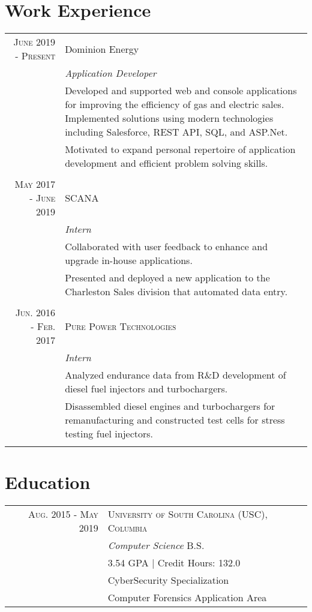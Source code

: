 \documentclass[a4paper,10pt]{article}
\begin{document}
\section{Work Experience}
\begin{tabular}{r|p{11cm}}
 \textsc{June 2019 - Present} & Dominion Energy
 \\&\emph{Application Developer}\\
 &\footnotesize{Developed and supported web and console applications for improving the efficiency of gas and electric sales.  
Implemented solutions using modern technologies including Salesforce, REST API, SQL, and ASP.Net.} \\ & \footnotesize{Motivated to expand personal repertoire of application development and efficient problem solving skills.
 }\\\multicolumn{2}{c}{} \\

 \textsc{May 2017 - June 2019} & SCANA
 \\&\emph{Intern}\\
 &\footnotesize{Collaborated with user feedback to enhance and upgrade in-house applications.} \\& \footnotesize{Presented and deployed a new application to the Charleston Sales division that automated data entry.
 }\\\multicolumn{2}{c}{} \\
 

 \textsc{Jun. 2016 - Feb. 2017} & \textsc{Pure Power Technologies} 
 \\&\emph{Intern}\\&\footnotesize{Analyzed endurance data from R\&D development of diesel fuel injectors and turbochargers.} \\& \footnotesize{ 
Disassembled diesel engines and turbochargers for remanufacturing and constructed test cells for stress testing fuel injectors. 
}\\\multicolumn{2}{c}{} 
\end{tabular}

\section{Education}
\begin{tabular}{r|l}	
\textsc{Aug. 2015 - May 2019     }    & \textsc{University of South Carolina (USC), Columbia}\\ &\emph{Computer Science} B.S. \\
& \footnotesize{3.54 GPA | Credit Hours: 132.0 }\\
& \footnotesize{CyberSecurity Specialization} \\
& \footnotesize{Computer Forensics Application Area } 
\end{tabular}
\end{document}
